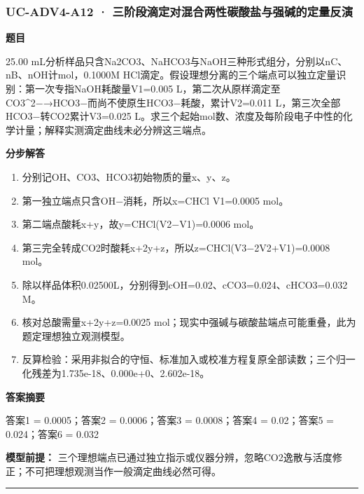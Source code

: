 \documentclass[UTF8,11pt,a4paper]{ctexart}
\begin{document}
\subsubsection*{UC-ADV4-A12 · 三阶段滴定对混合两性碳酸盐与强碱的定量反演}
\noindent\textbf{题目}\par
25.00 mL分析样品只含Na2CO3、NaHCO3与NaOH三种形式组分，分别以nC、nB、nOH计mol，0.1000M HCl滴定。假设理想分离的三个端点可以独立定量识别：第一次专指NaOH耗酸量V1=0.005 L，第二次从原样滴定至CO3\textasciicircum{}2−→HCO3−而尚不使原生HCO3−耗酸，累计V2=0.011 L，第三次全部HCO3−转CO2累计V3=0.025 L。求三个起始mol数、浓度及每阶段电子中性的化学计量；解释实测滴定曲线未必分辨这三端点。\par
\medskip\noindent\textbf{分步解答}
\begin{enumerate}
\item 分别记OH、CO3、HCO3初始物质的量x、y、z。
\item 第一独立端点只含OH−消耗，所以x=CHCl V1=0.0005 mol。
\item 第二端点酸耗x+y，故y=CHCl(V2−V1)=0.0006 mol。
\item 第三完全转成CO2时酸耗x+2y+z，所以z=CHCl(V3−2V2+V1)=0.0008 mol。
\item 除以样品体积0.02500L，分别得到cOH=0.02、cCO3=0.024、cHCO3=0.032 M。
\item 核对总酸需量x+2y+z=0.0025 mol；现实中强碱与碳酸盐端点可能重叠，此为题定理想独立观测模型。
\item 反算检验：采用非拟合的守恒、标准加入或校准方程复原全部读数；三个归一化残差为1.735e-18、0.000e+0、2.602e-18。
\end{enumerate}
\noindent\textbf{答案摘要}\par
答案1 = 0.0005；答案2 = 0.0006；答案3 = 0.0008；答案4 = 0.02；答案5 = 0.024；答案6 = 0.032\par
\noindent\textbf{模型前提：}
三个理想端点已通过独立指示或仪器分辨，忽略CO2逸散与活度修正；不可把理想观测当作一般滴定曲线必然可得。\par
\medskip\hrule\medskip
{}
\end{document}
